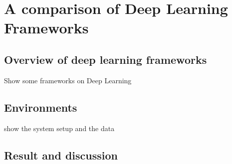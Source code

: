\chapter{A comparison of Deep Learning Frameworks}
\section{Overview of deep learning frameworks}
Show some frameworks on Deep Learning
\section{Environments}
show the system setup and the data
\section{Result and discussion}